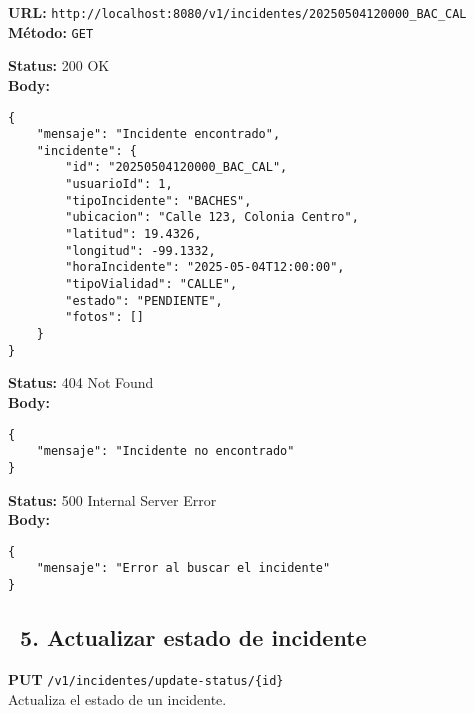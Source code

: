 \begin{tcolorbox}[request]
    \textbf{URL:} \textcolor{urlColor}{\texttt{http://localhost:8080/v1/incidentes/20250504120000\_BAC\_CAL}}\\
    \textbf{Método:} \textcolor{methodColor}{\texttt{GET}}
\end{tcolorbox}

\begin{tcolorbox}[response]
    \textbf{Status:} 200 OK\\
    \textbf{Body:}
    \begin{verbatim}
{
    "mensaje": "Incidente encontrado",
    "incidente": {
        "id": "20250504120000_BAC_CAL",
        "usuarioId": 1,
        "tipoIncidente": "BACHES",
        "ubicacion": "Calle 123, Colonia Centro",
        "latitud": 19.4326,
        "longitud": -99.1332,
        "horaIncidente": "2025-05-04T12:00:00",
        "tipoVialidad": "CALLE",
        "estado": "PENDIENTE",
        "fotos": []
    }
}
    \end{verbatim}
\end{tcolorbox}

\begin{tcolorbox}[response]
    \textbf{Status:} 404 Not Found\\
    \textbf{Body:}
    \begin{verbatim}
{
    "mensaje": "Incidente no encontrado"
}
    \end{verbatim}
\end{tcolorbox}

\begin{tcolorbox}[response]
    \textbf{Status:} 500 Internal Server Error\\
    \textbf{Body:}
    \begin{verbatim}
{
    "mensaje": "Error al buscar el incidente"
}
    \end{verbatim}
\end{tcolorbox}

\subsection*{\faServer\ 5. Actualizar estado de incidente}
\begin{tcolorbox}[endpoint]
    \textbf{PUT} \texttt{/v1/incidentes/update-status/\{id\}}\\
    Actualiza el estado de un incidente.
\end{tcolorbox}

